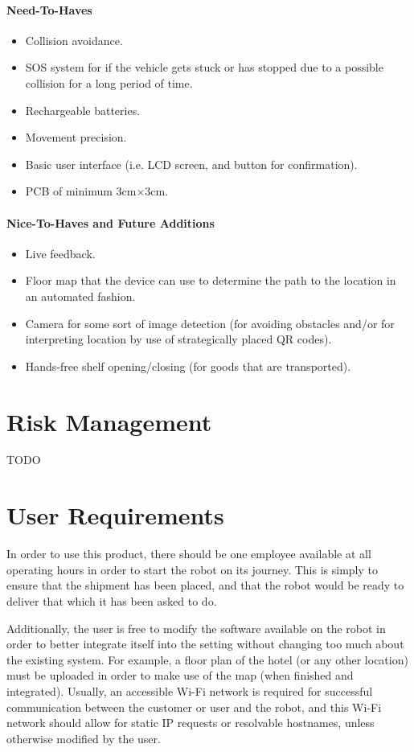 \documentclass[11pt]{article}
\begin{document}
\paragraph{Need-To-Haves}
\begin{itemize}
\item{Collision avoidance.}
\item{SOS system for if the vehicle gets stuck or has stopped due to a possible collision for a long period of time.}
\item{Rechargeable batteries.}
\item{Movement precision.}
\item{Basic user interface (i.e. LCD screen, and button for confirmation).}
\item{PCB of minimum 3cm$\times$3cm.}
\end{itemize}
\paragraph{Nice-To-Haves and Future Additions}
\begin{itemize}
\item{Live feedback.}
\item{Floor map that the device can use to determine the path to the location in an automated fashion.}
\item{Camera for some sort of image detection (for avoiding obstacles and/or for interpreting location by use of strategically placed QR codes).}
\item{Hands-free shelf opening/closing (for goods that are transported).}
\end{itemize}
\newpage
\section{Risk Management}
TODO
\newpage
\section{User Requirements}
In order to use this product, there should be one employee available at all operating hours in order to start the robot on its journey. This is simply to ensure that the shipment has been placed, and that the robot would be ready to deliver that which it has been asked to do.


Additionally, the user is free to modify the software available on the robot in order to better integrate itself into the setting without changing too much about the existing system. For example, a floor plan of the hotel (or any other location) must be uploaded in order to make use of the map (when finished and integrated). Usually, an accessible Wi-Fi network is required for successful communication between the customer or user and the robot, and this Wi-Fi network should allow for static IP requests or resolvable hostnames, unless otherwise modified by the user.
\end{document}
